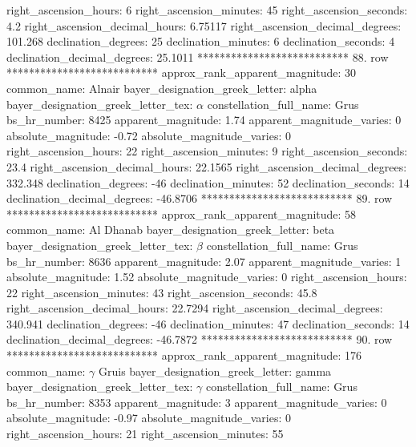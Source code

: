              right_ascension_hours: 6
           right_ascension_minutes: 45
           right_ascension_seconds: 4.2
     right_ascension_decimal_hours: 6.75117
   right_ascension_decimal_degrees: 101.268
               declination_degrees: 25
               declination_minutes: 6
               declination_seconds: 4
       declination_decimal_degrees: 25.1011
*************************** 88. row ***************************
    approx_rank_apparent_magnitude: 30
                       common_name: Alnair
    bayer_designation_greek_letter: alpha
bayer_designation_greek_letter_tex: $\alpha$
           constellation_full_name: Grus
                      bs_hr_number: 8425
                apparent_magnitude: 1.74
         apparent_magnitude_varies: 0
                absolute_magnitude: -0.72
         absolute_magnitude_varies: 0
             right_ascension_hours: 22
           right_ascension_minutes: 9
           right_ascension_seconds: 23.4
     right_ascension_decimal_hours: 22.1565
   right_ascension_decimal_degrees: 332.348
               declination_degrees: -46
               declination_minutes: 52
               declination_seconds: 14
       declination_decimal_degrees: -46.8706
*************************** 89. row ***************************
    approx_rank_apparent_magnitude: 58
                       common_name: Al Dhanab
    bayer_designation_greek_letter: beta
bayer_designation_greek_letter_tex: $\beta$
           constellation_full_name: Grus
                      bs_hr_number: 8636
                apparent_magnitude: 2.07
         apparent_magnitude_varies: 1
                absolute_magnitude: 1.52
         absolute_magnitude_varies: 0
             right_ascension_hours: 22
           right_ascension_minutes: 43
           right_ascension_seconds: 45.8
     right_ascension_decimal_hours: 22.7294
   right_ascension_decimal_degrees: 340.941
               declination_degrees: -46
               declination_minutes: 47
               declination_seconds: 14
       declination_decimal_degrees: -46.7872
*************************** 90. row ***************************
    approx_rank_apparent_magnitude: 176
                       common_name: $\gamma$ Gruis
    bayer_designation_greek_letter: gamma
bayer_designation_greek_letter_tex: $\gamma$
           constellation_full_name: Grus
                      bs_hr_number: 8353
                apparent_magnitude: 3
         apparent_magnitude_varies: 0
                absolute_magnitude: -0.97
         absolute_magnitude_varies: 0
             right_ascension_hours: 21
           right_ascension_minutes: 55
